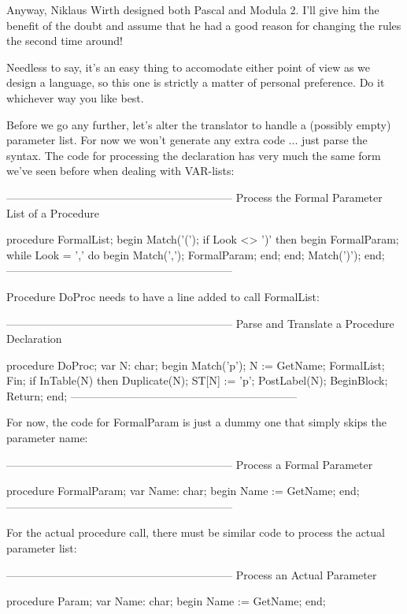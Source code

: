 \documentclass[float=false, crop=false]{standalone}
\begin{document}
Anyway, Niklaus Wirth designed both Pascal and Modula 2. I'll give him the
benefit of the doubt and assume that he had a good reason for changing the rules
the second time around!

Needless to say, it's an easy thing to accomodate either point of view as we
design a language, so this one is strictly a matter of personal preference. Do
it whichever way you like best.

Before we go any further, let's alter the translator to handle a (possibly
empty) parameter list. For now we won't generate any extra code ... just parse
the syntax. The code for processing the declaration has very much the same form
we've seen before when dealing with VAR-lists:


{--------------------------------------------------------------}
{ Process the Formal Parameter List of a Procedure }

procedure FormalList;
begin
     Match('(');
     if Look <> ')' then begin
          FormalParam;
          while Look = ',' do begin
               Match(',');
               FormalParam;
          end;
     end;
     Match(')');
end;
{--------------------------------------------------------------}


Procedure DoProc needs to have a line added to call FormalList:


{--------------------------------------------------------------}
{ Parse and Translate a Procedure Declaration }

procedure DoProc;
var N: char;
begin
     Match('p');
     N := GetName;
     FormalList;
     Fin;
     if InTable(N) then Duplicate(N);
     ST[N] := 'p';
     PostLabel(N);
     BeginBlock;
     Return;
end;
{--------------------------------------------------------------}


For now, the code for FormalParam is just a dummy one that simply skips the
parameter name:


{--------------------------------------------------------------}
{ Process a Formal Parameter }

procedure FormalParam;
var Name:  char;
begin
     Name := GetName;
end;
{--------------------------------------------------------------}


For the actual procedure call, there must be similar code to process the actual
parameter list:


{--------------------------------------------------------------}
{ Process an Actual Parameter }

procedure Param;
var Name:  char;
begin
     Name := GetName;
end;
\end{document}
